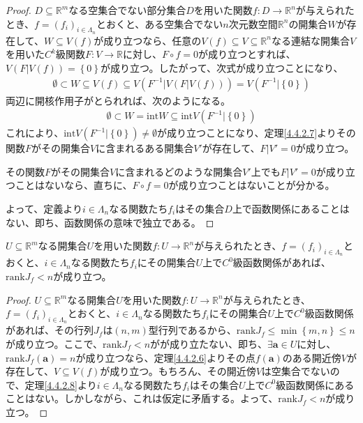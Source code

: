 \documentclass[dvipdfmx]{jsarticle}
\begin{document}
\begin{proof}
$D \subseteq \mathbb{R}^{m}$なる空集合でない部分集合$D$を用いた関数$f:D \rightarrow \mathbb{R}^{n}$が与えられたとき、$f = \left( f_{i} \right)_{i \in \varLambda_{n}}$とおくと、ある空集合でない$n$次元数空間$\mathbb{R}^{n}$の開集合$W$が存在して、$W \subseteq V(f)$が成り立つなら、任意の$V(f) \subseteq V \subseteq \mathbb{R}^{n}$なる連結な開集合$V$を用いた$C^{k}$級関数$F:V \rightarrow \mathbb{R}$に対し、$F \circ f = 0$が成り立つとすれば、$V\left( F|V(f) \right) = \left\{ 0 \right\}$が成り立つ。したがって、次式が成り立つことになり、
\begin{align*}
\emptyset \subset W \subseteq V(f) \subseteq V\left( F^{- 1}|V\left( F|V(f) \right) \right) = V\left( F^{- 1}|\left\{ 0 \right\} \right)
\end{align*}
両辺に開核作用子がとられれば、次のようになる。
\begin{align*}
\emptyset \subset W = \mathrm{int}W \subseteq \mathrm{int}{V\left( F^{- 1}|\left\{ 0 \right\} \right)}
\end{align*}
これにより、$\mathrm{int}{V\left( F^{- 1}|\left\{ 0 \right\} \right)} \neq \emptyset$が成り立つことになり、定理\ref{4.4.2.7}よりその関数$F$がその開集合$V$に含まれるある開集合$V'$が存在して、$F|V' = 0$が成り立つ。\par
その関数$F$がその開集合$V$に含まれるどのような開集合$V'$上でも$F|V' = 0$が成り立つことはないなら、直ちに、$F \circ f = 0$が成り立つことはないことが分かる。\par
よって、定義より$i \in \varLambda_{n}$なる関数たち$f_{i}$はその集合$D$上で函数関係にあることはない、即ち、函数関係の意味で独立である。
\end{proof}
\begin{thm}\label{4.4.2.9}
$U \subseteq \mathbb{R}^{m}$なる開集合$U$を用いた関数$f:U \rightarrow \mathbb{R}^{n}$が与えられたとき、$f = \left( f_{i} \right)_{i \in \varLambda_{n}}$とおくと、$i \in \varLambda_{n}$なる関数たち$f_{i}$にその開集合$U$上で$C^{0}$級函数関係があれば、$\mathrm{rank}J_{f} < n$が成り立つ。
\end{thm}
\begin{proof}
$U \subseteq \mathbb{R}^{m}$なる開集合$U$を用いた関数$f:U \rightarrow \mathbb{R}^{n}$が与えられたとき、$f = \left( f_{i} \right)_{i \in \varLambda_{n}}$とおくと、$i \in \varLambda_{n}$なる関数たち$f_{i}$にその開集合$U$上で$C^{0}$級函数関係があれば、その行列$J_{f}$は$(n,m)$型行列であるから、$\mathrm{rank}J_{f} \leq \min\left\{ m,n \right\} \leq n$が成り立つ。ここで、$\mathrm{rank}J_{f} < n$がが成り立たない、即ち、$\exists\mathbf{a} \in U$に対し、$\mathrm{rank}J_{f}\left( \mathbf{a} \right) = n$が成り立つなら、定理\ref{4.4.2.6}よりその点$f\left( \mathbf{a} \right)$のある開近傍$V$が存在して、$V \subseteq V(f)$が成り立つ。もちろん、その開近傍$V$は空集合でないので、定理\ref{4.4.2.8}より$i \in \varLambda_{n}$なる関数たち$f_{i}$はその集合$U$上で$C^{0}$級函数関係にあることはない。しかしながら、これは仮定に矛盾する。よって、$\mathrm{rank}J_{f} < n$が成り立つ。
\end{proof}
\end{document}
